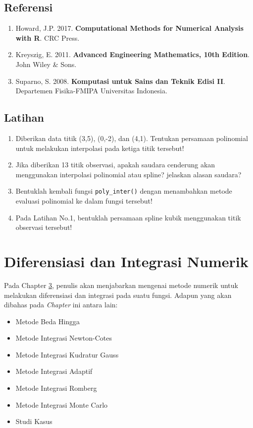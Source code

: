 \documentclass[]{book}
\providecommand{\tightlist}{%
  \setlength{\itemsep}{0pt}\setlength{\parskip}{0pt}}
\theoremstyle{definition}
\theoremstyle{definition}
\theoremstyle{definition}
\theoremstyle{remark}
\begin{document}
\hypertarget{referensi-7}{%
\section{Referensi}\label{referensi-7}}

\begin{enumerate}
\def\labelenumi{\arabic{enumi}.}
\tightlist
\item
  Howard, J.P. 2017. \textbf{Computational Methods for Numerical Analysis with R}. CRC Press.
\item
  Kreyszig, E. 2011. \textbf{Advanced Engineering Mathematics, 10th Edition}. John Wiley \& Sons.
\item
  Suparno, S. 2008. \textbf{Komputasi untuk Sains dan Teknik Edisi II}. Departemen Fisika-FMIPA Universitas Indonesia.
\end{enumerate}

\hypertarget{latihan-2}{%
\section{Latihan}\label{latihan-2}}

\begin{enumerate}
\def\labelenumi{\arabic{enumi}.}
\tightlist
\item
  Diberikan data titik (3,5), (0,-2), dan (4,1). Tentukan persamaan polinomial untuk melakukan interpolasi pada ketiga titik tersebut!
\item
  Jika diberikan 13 titik observasi, apakah saudara cenderung akan menggunakan interpolasi polinomial atau spline? jelaskan alasan saudara?
\item
  Bentuklah kembali fungsi \texttt{poly\_inter()} dengan menambahkan metode evaluasi polinomial ke dalam fungsi tersebut!
\item
  Pada Latihan No.1, bentuklah persamaan spline kubik menggunakan titik observasi tersebut!
\end{enumerate}

\hypertarget{diffinteg}{%
\chapter{Diferensiasi dan Integrasi Numerik}\label{diffinteg}}

Pada Chapter \ref{diffinteg}, penulis akan menjabarkan mengenai metode numerik untuk melakukan diferensiasi dan integrasi pada suatu fungsi. Adapun yang akan dibahas pada \emph{Chapter} ini antara lain:

\begin{itemize}
\tightlist
\item
  Metode Beda Hingga
\item
  Metode Integrasi Newton-Cotes
\item
  Metode Integrasi Kudratur Gauss
\item
  Metode Integrasi Adaptif
\item
  Metode Integrasi Romberg
\item
  Metode Integrasi Monte Carlo
\item
  Studi Kasus
\end{itemize}
\end{document}
